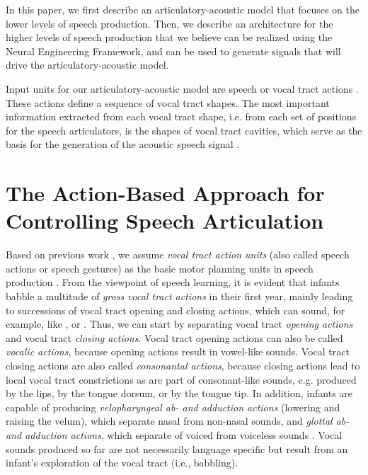 \documentclass[conference]{IEEEtran}
\let\ipa\textipa
\begin{document}
In this paper, we first describe an articulatory-acoustic model
that focuses on the lower levels of speech production.
Then, we describe an architecture for the higher levels
of speech production that we believe can be realized
using the Neural Engineering Framework,
and can be used to generate signals that
will drive the articulatory-acoustic model.

Input units for our articulatory-acoustic model are speech or vocal tract actions
\cite{kroger1993,kroger2010}. These actions define a sequence of vocal
tract shapes. The most important information extracted from each vocal
tract shape, i.e. from each set of positions
for the speech articulators, is the
shapes of vocal tract cavities, which serve as the basis for the
generation of the acoustic speech signal \cite{kroger1993}.

\section{The Action-Based Approach for Controlling Speech
  Articulation}

Based on previous work \cite{saltzman1989,goldstein2006}, we assume
\textit{vocal tract action units} (also called speech actions or
speech gestures) as the basic motor planning units in speech
production \cite{kroger2010}. From the viewpoint of speech learning, it
is evident that infants babble a multitude of
\textit{gross vocal tract actions} in their first year,
mainly leading to successions of
vocal tract opening and closing actions,
which can sound, for example,
like \ipa{[bAbA]}, \ipa{[dAdA]} or \ipa{[gAgA]}
\cite{kroger2009,kroger2014}. Thus, we
can start by separating vocal tract \textit{opening actions} and vocal
tract \textit{closing actions}. Vocal tract opening actions can also
be called \textit{vocalic actions}, because opening actions result in
vowel-like sounds. Vocal tract closing actions are also called
\textit{consonantal actions}, because closing actions
lead to local vocal tract constrictions
as are part of consonant-like sounds,
e.g. produced by the lips, by the tongue dorsum, or by
the tongue tip. In addition, infants are capable of producing
\textit{velopharyngeal ab- and adduction actions} (lowering and
raising the velum), which separate nasal from
non-nasal sounds, and \textit{glottal ab- and adduction actions},
which separate of voiced from voiceless sounds \cite{kuhl2004}.
Vocal sounds produced so far are not
necessarily language specific but result from an infant's exploration of
the vocal tract (i.e., babbling).
\end{document}
